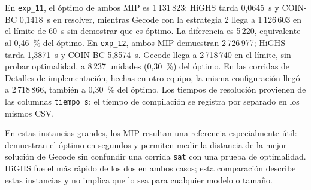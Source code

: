 En \texttt{exp\_11}, el óptimo de ambos MIP es 1\,131\,823: HiGHS tarda 0,0645~s y COIN-BC 0,1418~s en resolver, mientras Gecode con la estrategia 2 llega a 1\,126\,603 en el límite de 60~s sin demostrar que es óptimo. La diferencia es 5\,220, equivalente al 0,46~\% del óptimo. En \texttt{exp\_12}, ambos MIP demuestran 2\,726\,977; HiGHS tarda 1,3871~s y COIN-BC 5,8574~s. Gecode llega a 2\,718\,740 en el límite, sin probar optimalidad, a 8\,237 unidades (0,30~\%) del óptimo. En las corridas de Detalles de implementación, hechas en otro equipo, la misma configuración llegó a 2\,718\,866, también a 0,30~\% del óptimo. Los tiempos de resolución provienen de las columnas \texttt{tiempo\_s}; el tiempo de compilación se registra por separado en los mismos CSV.

En estas instancias grandes, los MIP resultan una referencia especialmente útil: demuestran el óptimo en segundos y permiten medir la distancia de la mejor solución de Gecode sin confundir una corrida \texttt{sat} con una prueba de optimalidad. HiGHS fue el más rápido de los dos en ambos casos; esta comparación describe estas instancias y no implica que lo sea para cualquier modelo o tamaño.
